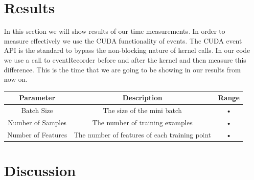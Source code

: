 \documentclass[11pt,a4paper]{article}
\begin{document}
\section{Results}
In this section we will show results of our time measurements. In order to measure effectively we
use the CUDA functionality of events. The CUDA event API is the standard to bypass the non-blocking
nature of kernel calls. In our code we use a call to eventRecorder before and after the kernel and
then measure this difference. This is the time that we are going to be showing in our results from
now on.

\begin{tabular}{|c|c|c|}
\hline
Parameter & Description & Range \\
\hline
Batch Size & The size of the mini batch & • \\
\hline
Number of Samples & The number of training examples & • \\
\hline
Number of Features & The number of features of each training point & • \\
\hline
\end{tabular}

\section{Discussion}



\end{document}
